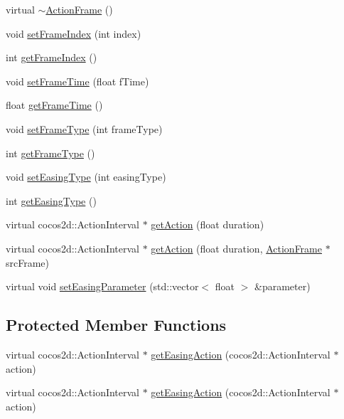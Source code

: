 \begin{DoxyCompactItemize}
\item 
virtual \hyperlink{classcocostudio_1_1ActionFrame_a93184c6c33b7271198d4956ea2862327}{$\sim$\+Action\+Frame} ()
\item 
void \hyperlink{classcocostudio_1_1ActionFrame_adbca76015f4ce16ecb2bb0bca49ef712}{set\+Frame\+Index} (int index)
\item 
int \hyperlink{classcocostudio_1_1ActionFrame_ac0a9d3c72983fed42f1a8822a0375499}{get\+Frame\+Index} ()
\item 
void \hyperlink{classcocostudio_1_1ActionFrame_a9a64130e3c776f083ee959b6e261b78e}{set\+Frame\+Time} (float f\+Time)
\item 
float \hyperlink{classcocostudio_1_1ActionFrame_aaf531864a6d4eecf2cffecc0999512c7}{get\+Frame\+Time} ()
\item 
void \hyperlink{classcocostudio_1_1ActionFrame_ad2086156bd154ae75dc32515fd150314}{set\+Frame\+Type} (int frame\+Type)
\item 
int \hyperlink{classcocostudio_1_1ActionFrame_a6dcd7610871fcbef3ed3806e56cd790a}{get\+Frame\+Type} ()
\item 
void \hyperlink{classcocostudio_1_1ActionFrame_ac853eabdb94f1f08deb52e09b8aece1d}{set\+Easing\+Type} (int easing\+Type)
\item 
int \hyperlink{classcocostudio_1_1ActionFrame_ac9cbd5d9b6751f4802b83a35941b680f}{get\+Easing\+Type} ()
\item 
virtual cocos2d\+::\+Action\+Interval $\ast$ \hyperlink{classcocostudio_1_1ActionFrame_a9b4544cd2155cbd46a61dd866daab18b}{get\+Action} (float duration)
\item 
virtual cocos2d\+::\+Action\+Interval $\ast$ \hyperlink{classcocostudio_1_1ActionFrame_ac31860becfcfe2d19331a51197ee79bd}{get\+Action} (float duration, \hyperlink{classcocostudio_1_1ActionFrame}{Action\+Frame} $\ast$src\+Frame)
\item 
virtual void \hyperlink{classcocostudio_1_1ActionFrame_afbb1dbf786653383c15ece664c90fd85}{set\+Easing\+Parameter} (std\+::vector$<$ float $>$ \&parameter)
\end{DoxyCompactItemize}
\subsection*{Protected Member Functions}
\begin{DoxyCompactItemize}
\item 
virtual cocos2d\+::\+Action\+Interval $\ast$ \hyperlink{classcocostudio_1_1ActionFrame_a73e7244a9bebca9977830d861194e41c}{get\+Easing\+Action} (cocos2d\+::\+Action\+Interval $\ast$action)
\item 
virtual cocos2d\+::\+Action\+Interval $\ast$ \hyperlink{classcocostudio_1_1ActionFrame_ac3846843beb99f0baa38d3473b7961e0}{get\+Easing\+Action} (cocos2d\+::\+Action\+Interval $\ast$action)
\end{DoxyCompactItemize}
